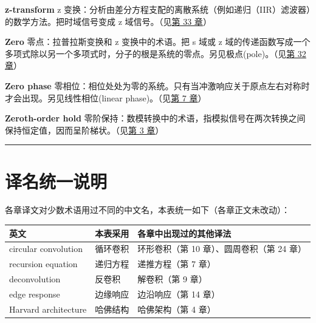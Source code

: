 \textbf{z-transform} z
变换：分析由差分方程支配的离散系统（例如递归（IIR）滤波器）的数学方法。把时域信号变成
z 域信号。（见\hyperref[ch-33]{第 33 章}）

\textbf{Zero} 零点：拉普拉斯变换和 z 变换中的术语。把 s 域或 z
域的传递函数写成一个多项式除以另一个多项式时，分子的根是系统的零点。另见极点(pole)。（见\hyperref[ch-32]{第
32 章}）

\textbf{Zero phase}
零相位：相位处处为零的系统。只有当冲激响应关于原点左右对称时才会出现。另见线性相位(linear
phase)。（见\hyperref[ch-07]{第 7 章}）

\textbf{Zeroth-order hold}
零阶保持：数模转换中的术语，指模拟信号在两次转换之间保持恒定值，因而呈阶梯状。（见\hyperref[ch-03]{第
3 章}）

\begin{center}\rule{0.5\linewidth}{0.5pt}\end{center}

\section{译名统一说明}

各章译文对少数术语用过不同的中文名，本表统一如下（各章正文未改动）：

{\def\LTcaptype{none} %
\begin{longtable}[]{@{}
  >{\raggedright\arraybackslash}p{}
  >{\raggedright\arraybackslash}p{}
  >{\raggedright\arraybackslash}p{}@{}}
\toprule\noalign{}
\begin{minipage}[b]{\linewidth}\raggedright
英文
\end{minipage} & \begin{minipage}[b]{\linewidth}\raggedright
本表采用
\end{minipage} & \begin{minipage}[b]{\linewidth}\raggedright
各章中出现过的其他译法
\end{minipage} \\
\midrule\noalign{}
\endhead
\bottomrule\noalign{}
\endlastfoot
circular convolution & 循环卷积 & 环形卷积（第 10 章）、圆周卷积（第 24
章） \\
recursion equation & 递归方程 & 递推方程（第 7 章） \\
deconvolution & 反卷积 & 解卷积（第 9 章） \\
edge response & 边缘响应 & 边沿响应（第 14 章） \\
Harvard architecture & 哈佛结构 & 哈佛架构（第 4 章） \\
\end{longtable}
}
